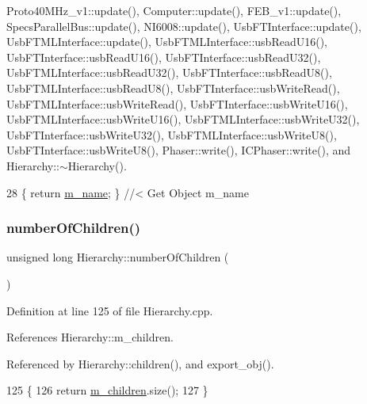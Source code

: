 Proto40\+M\+Hz\+\_\+v1\+::update(), Computer\+::update(), F\+E\+B\+\_\+v1\+::update(), Specs\+Parallel\+Bus\+::update(), N\+I6008\+::update(), Usb\+F\+T\+Interface\+::update(), Usb\+F\+T\+M\+L\+Interface\+::update(), Usb\+F\+T\+M\+L\+Interface\+::usb\+Read\+U16(), Usb\+F\+T\+Interface\+::usb\+Read\+U16(), Usb\+F\+T\+Interface\+::usb\+Read\+U32(), Usb\+F\+T\+M\+L\+Interface\+::usb\+Read\+U32(), Usb\+F\+T\+Interface\+::usb\+Read\+U8(), Usb\+F\+T\+M\+L\+Interface\+::usb\+Read\+U8(), Usb\+F\+T\+Interface\+::usb\+Write\+Read(), Usb\+F\+T\+M\+L\+Interface\+::usb\+Write\+Read(), Usb\+F\+T\+Interface\+::usb\+Write\+U16(), Usb\+F\+T\+M\+L\+Interface\+::usb\+Write\+U16(), Usb\+F\+T\+M\+L\+Interface\+::usb\+Write\+U32(), Usb\+F\+T\+Interface\+::usb\+Write\+U32(), Usb\+F\+T\+M\+L\+Interface\+::usb\+Write\+U8(), Usb\+F\+T\+Interface\+::usb\+Write\+U8(), Phaser\+::write(), I\+C\+Phaser\+::write(), and Hierarchy\+::$\sim$\+Hierarchy().


\begin{DoxyCode}
28 \{ \textcolor{keywordflow}{return} \hyperlink{classObject_a8b83c95c705d2c3ba0d081fe1710f48d}{m\_name}; \} \textcolor{comment}{//< Get Object m\_name}
\end{DoxyCode}
\mbox{\label{classHierarchy_ab16e84de65fd84e14001a6cf941c8be4}} 
\subsubsection{\texorpdfstring{number\+Of\+Children()}{numberOfChildren()}}
{\footnotesize\ttfamily unsigned long Hierarchy\+::number\+Of\+Children (\begin{DoxyParamCaption}{ }\end{DoxyParamCaption})\hspace{0.3cm}{\ttfamily [inherited]}}



Definition at line 125 of file Hierarchy.\+cpp.



References Hierarchy\+::m\+\_\+children.



Referenced by Hierarchy\+::children(), and export\+\_\+obj().


\begin{DoxyCode}
125                                            \{
126   \textcolor{keywordflow}{return} \hyperlink{classHierarchy_a038816763941fd4a930504917f60483b}{m\_children}.size();
127 \}
\end{DoxyCode}
\mbox{\label{classHierarchy_aee461dc930ce3871636ff87f075b1b83}} 
